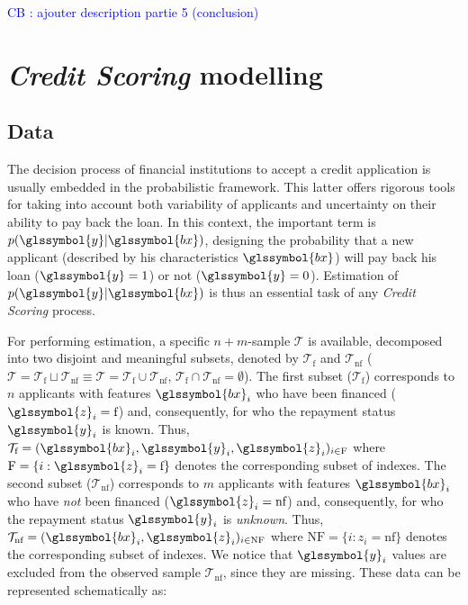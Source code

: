 \textcolor{blue}{CB : ajouter description partie 5 (conclusion)}

\section{\textit{Credit Scoring} modelling} \label{sec:criteres}

\subsection{Data} 

The decision process of financial institutions to accept a credit application is usually embedded in the  probabilistic framework. This latter offers rigorous tools for taking into account both variability of applicants and uncertainty on their ability to pay back the loan. In this context, the important term is $p(\glssymbol{y}|\glssymbol{bx})$, designing the probability that a new applicant (described by his characteristics $\glssymbol{bx}$) will pay back his loan ($\glssymbol{y}=1$) or not ($\glssymbol{y}=0$). Estimation of $p(\glssymbol{y}|\glssymbol{bx})$ is thus an essential task of any \textit{Credit Scoring} process.

For performing estimation, a specific $n + m$-sample $\mathcal{T}$ is available, decomposed into two disjoint and meaningful subsets, denoted by $\mathcal{T}_{\text{f}}$ and $\mathcal{T}_{\text{nf}}$ ($\mathcal{T}=\mathcal{T}_{\text{f}} \sqcup \mathcal{T}_{\text{nf}} \equiv \mathcal{T}=\mathcal{T}_{\text{f}} \cup \mathcal{T}_{\text{nf}}$, $\mathcal{T}_{\text{f}}\cap \mathcal{T}_{\text{nf}}=\emptyset$). The first subset ($\mathcal{T}_{\text{f}}$) corresponds to $n$ applicants with features $\glssymbol{bx}_i$ who have been financed ($\glssymbol{z}_i={\text{f}}$) and, consequently, for who the repayment status $\glssymbol{y}_i$ is known. Thus, $\mathcal{T}_{\text{f}}=(\glssymbol{bx}_i,\glssymbol{y}_i,\glssymbol{z}_i)_{i\in \text{F}}$ where $\text{F}=\{i:\glssymbol{z}_i={\text{f}}\}$ denotes the corresponding subset of indexes. The second subset ($\mathcal{T}_{\text{nf}}$) corresponds to $m$ applicants with features $\glssymbol{bx}_i$ who have {\it not} been financed ($\glssymbol{z}_i={\text{nf}}$) and, consequently, for who the repayment status $\glssymbol{y}_i$ is {\it unknown}. Thus, $\mathcal{T}_{\text{nf}}=(\glssymbol{bx}_i,\glssymbol{z}_i)_{i\in \text{NF}}$ where $\text{NF}=\{i:z_i={\text{nf}}\}$ denotes the corresponding subset of indexes. We notice that $\glssymbol{y}_i$ values are excluded from the observed sample $\mathcal{T}_{\text{nf}}$, since they are missing. These data can be represented schematically as:

